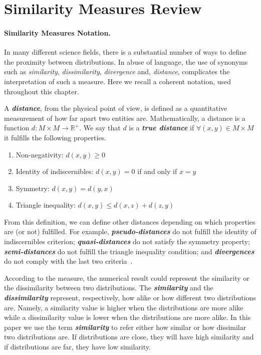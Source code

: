 \section{Similarity Measures Review}\label{sec:measures}

\paragraph{Similarity Measures Notation.}
In many different science fields, there is a substantial number of ways to define the proximity between distributions. In abuse of language, the use of synonyms such as \textit{similarity}, \textit{dissimilarity}, \textit{divergence} and, \textit{distance}, complicates the interpretation of such a measure. Here we recall a coherent notation, used throughout this chapter.

A \textbf{\textit{distance}}, from the physical point of view, is defined as a quantitative measurement of how far apart two entities are. Mathematically, a distance is a function $d : M \times M \rightarrow \mathbb{R}^+$. We say that $d$ is a \textbf{\textit{true distance}} if $\forall (x, y) \in M \times M$ it fulfills the following properties.

\begin{enumerate}%
 \item Non-negativity: $d(x, y)\geq 0$
 \item Identity of indiscernibles: $d(x, y) = 0$ if and only if $x = y$
 \item Symmetry: $d(x, y) = d(y, x)$
 \item Triangle inequality: $d(x, y) \leq d(x, z) + d(z, y)$
\end{enumerate}

From this definition, we can define other distances depending on which properties are (or not) fulfilled. For example, \textbf{\textit{pseudo-distances}} do not fulfill the identity of indiscernibles criterion; \textbf{\textit{quasi-distances}} do not satisfy the symmetry property; \textbf{\textit{semi-distances}} do not fulfill the triangle inequality condition; and \textbf{\textit{divergences}} do not comply with the last two criteria~\citep{Khamsi:JFPTA:2015}.

According to the measure, the numerical result could represent the similarity or the dissimilarity between two distributions. The \textbf{\textit{similarity}} and the \textbf{\textit{dissimilarity}} represent, respectively, how alike or how different two distributions are. Namely, a similarity value is higher when the distributions are more alike while a dissimilarity value is lower when the distributions are more alike. In this paper we use the term \textbf{\textit{similarity}} to refer either how similar or how dissimilar two distributions are. If distributions are close, they will have high similarity and if distributions are far, they have low similarity. 
 
